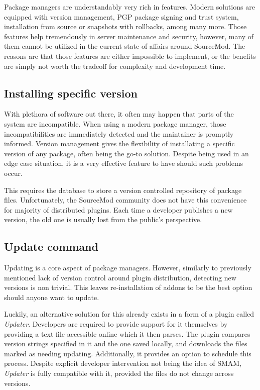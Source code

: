 Package managers are understandably very rich in features.
Modern solutions are equipped with version management, PGP package signing and trust system, installation from source or snapshots with rollbacks, among many more.
Those features help tremendously in server maintenance and security, however, many of them cannot be utilized in the current state of affairs around SourceMod.
The reasons are that those features are either impossible to implement, or the benefits are simply not worth the tradeoff for complexity and development time.

\subsection{Installing specific version}

With plethora of software out there, it often may happen that parts of the system are incompatible.
When using a modern package manager, those incompatibilities are immediately detected and the maintainer is promptly informed.
Version management gives the flexibility of installating a specific version of any package, often being the go-to solution.
Despite being used in an edge case situation, it is a very effective feature to have should such problems occur.

This requires the database to store a version controlled repository of package files.
Unfortunately, the SourceMod community does not have this convenience for majority of distributed plugins.
Each time a developer publishes a new version, the old one is usually lost from the public's perspective.

\subsection{Update command}

Updating is a core aspect of package managers.
However, similarly to previously mentioned lack of version control around plugin distribution, detecting new versions is non trivial.
This leaves re-installation of addons to be the best option should anyone want to update.

Luckily, an alternative solution for this already exists in a form of a plugin called \textit{Updater}.
Developers are required to provide support for it themselves by providing a text file accessible online which it then parses.
The plugin compares version strings specified in it and the one saved locally, and downloads the files marked as needing updating.
Additionally, it provides an option to schedule this process.
Despite explicit developer intervention not being the idea of SMAM, \textit{Updater} is fully compatible with it, provided the files do not change across versions.
